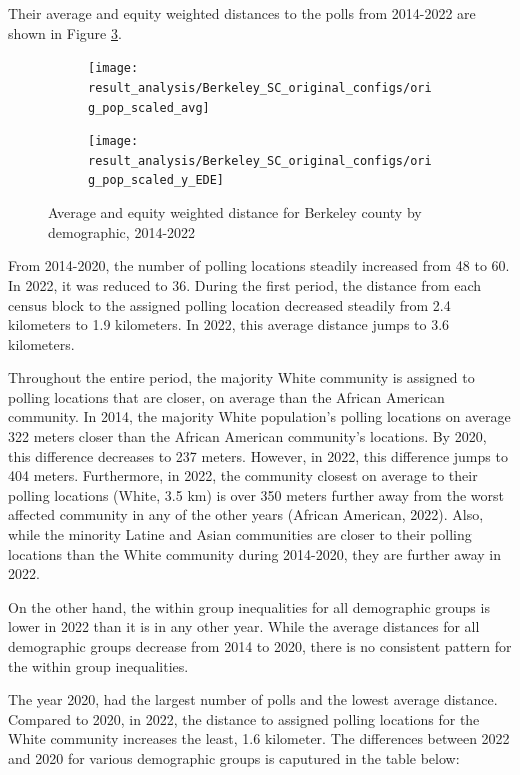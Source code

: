 \documentclass[11pt]{article}
\theoremstyle{remark}
\theoremstyle{definition}
\begin{document}
Their average and equity weighted distances to the polls from 2014-2022 are shown in Figure \ref{fig:Berkeley distance graphs}.

\begin{figure}
	\begin{subfigure}{.8\textwidth}
		\centering
		\texttt{[image: result\_analysis/Berkeley\_SC\_original\_configs/orig\_pop\_scaled\_avg]}
		\label{sfig:Berkeley avg dist}
	\end{subfigure} \newline
	\begin{subfigure}{.8\textwidth}
		\centering
		\texttt{[image: result\_analysis/Berkeley\_SC\_original\_configs/orig\_pop\_scaled\_y\_EDE]}
		\label{sfig:Berkeley equity dist}
	\end{subfigure}
	\caption{Average and equity weighted distance for Berkeley county by demographic, 2014-2022}
	\label{fig:Berkeley distance graphs}
\end{figure}


From 2014-2020, the number of polling locations steadily increased from 48 to 60. In 2022, it was reduced to 36. During the first period, the distance from each census block to the assigned polling location decreased steadily from 2.4 kilometers to 1.9 kilometers. In 2022, this average distance jumps to 3.6 kilometers. 

Throughout the entire period, the majority White community is assigned to polling locations that are closer, on average than the African American community. In 2014, the majority White population's polling locations on average 322 meters closer than the African American community's locations. By 2020, this difference decreases to 237 meters. However, in 2022, this difference jumps to 404 meters. Furthermore, in 2022, the community closest on average to their polling locations (White, 3.5 km) is over 350 meters further away from the worst affected community in any of the other years (African American, 2022). Also, while the minority Latine and Asian communities are closer to their polling locations than the White community during 2014-2020, they are further away in 2022.

On the other hand, the within group inequalities for all demographic groups is lower in 2022 than it is in any other year. While the average distances for all demographic groups decrease from 2014 to 2020, there is no consistent pattern for the within group inequalities.

The year 2020, had the largest number of polls and the lowest average distance. Compared to 2020, in 2022, the distance to assigned polling locations for the White community increases the least, 1.6 kilometer. The differences between 2022 and 2020 for various demographic groups is caputured in the table below:
\end{document}
